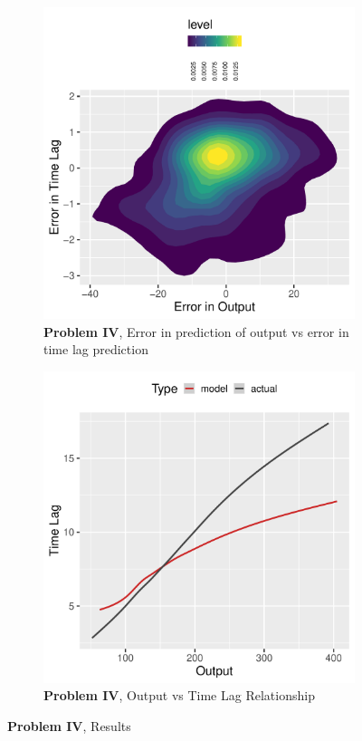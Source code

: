 \documentclass[envcountsect,runningheads]{llncs}
\theoremstyle{etoile}
\begin{document}
\begin{figure}
  \begin{subfigure}[b]{0.4\textwidth}
    \centering
    \includegraphics[width=\textwidth]{figures/exp4_errors}
    \caption{ \textbf{Problem IV}, Error in prediction of output vs error in time lag prediction} 
    \label{fig:problem4_error}
  \end{subfigure}
  \hfill
  \begin{subfigure}[b]{0.4\textwidth}
    \centering
    \includegraphics[width=\textwidth]{figures/exp4_predictive_curves}
    \caption{ \textbf{Problem IV}, Output vs Time Lag Relationship} 
    \label{fig:problem4_curves}
  \end{subfigure}
  
  \caption{\textbf{Problem IV}, Results}
\end{figure}
\end{document}
